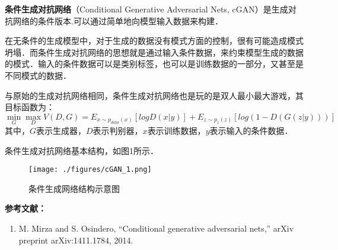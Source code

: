 
\textbf{条件生成对抗网络}（Conditional Generative Adversarial Nets, cGAN）是生成对抗网络的条件版本.可以通过简单地向模型输入数据来构建．

在无条件的生成模型中，对于生成的数据没有模式方面的控制，很有可能造成模式坍塌．而条件生成对抗网络的思想就是通过输入条件数据，来约束模型生成的数据的模式．输入的条件数据可以是类别标签，也可以是训练数据的一部分，又甚至是不同模式的数据．

与原始的生成对抗网络相同，条件生成对抗网络也是玩的是双人最小最大游戏，其目标函数为：
\begin{equation}
\mathop{\min}\limits_G \mathop {\max }\limits_D V(D,G)=E_{x\sim p_{data}(x)}[logD(x|y)]+E_{z\sim p_z(z)}[log(1-D(G(z|y)))]
\end{equation}
其中，$G$表示生成器，$D$表示判别器，$x$表示训练数据，$y$表示输入的条件数据．

条件生成对抗网络基本结构，如图1所示．
\begin{figure}[ht]
\centering
\texttt{[image: ./figures/cGAN\_1.png]}
\caption{条件生成网络结构示意图} \label{cGAN_fig1}
\end{figure}



\textbf{参考文献：}
\begin{enumerate}
\item M. Mirza and S. Osindero, “Conditional generative adversarial nets,” arXiv preprint arXiv:1411.1784, 2014.
\end{enumerate}
